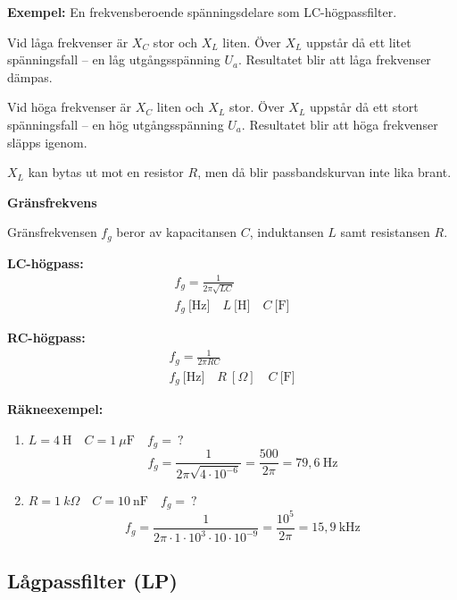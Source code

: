 \textbf{Exempel:} En frekvensberoende spänningsdelare som LC-högpassfilter.

Vid låga frekvenser är \(X_C\) stor och \(X_L\) liten.
Över \(X_L\) uppstår då ett litet spänningsfall -- en låg utgångsspänning \(U_a\).
Resultatet blir att låga frekvenser dämpas.

Vid höga frekvenser är \(X_C\) liten och \(X_L\) stor.
Över \(X_L\) uppstår då ett stort spänningsfall -- en hög utgångsspänning
\(U_a\).
Resultatet blir att höga frekvenser släpps igenom.

\(X_L\) kan bytas ut mot en resistor \(R\), men då blir passbandskurvan inte lika brant.

\textbf{Gränsfrekvens}

Gränsfrekvensen \(f_g\) beror av kapacitansen \(C\), induktansen \(L\) samt
resistansen \(R\).

\textbf{LC-högpass:}
\begin{gather*}
  f_g = \frac{1}{2\pi \sqrt{LC}} \\
  f_g\ \text{[Hz]} \quad L\ \text{[H]} \quad C\ \text{[F]}
\end{gather*}

\textbf{RC-högpass:}
\begin{gather*}
  f_g = \frac{1}{2\pi RC}\\
  f_g\ \text{[Hz]} \quad R\ [\Omega] \quad C\ \text{[F]}
\end{gather*}

\textbf{Räkneexempel:}
\begin{enumerate}
\item \(L = 4\ \text{H} \quad C = 1\ \mu\text{F} \quad f_g =\ ?\)
  \[
  f_g = \frac{1}{2\pi \sqrt{4 \cdot 10^{-6}}} = \frac{500}{2\pi }
  = 79,6\ \text{Hz}
  \]
\item \(R = 1\ k\Omega \quad C = 10\ \text{nF} \quad f_g =\ ?\)
  \[
    f_g = \frac{1}{2\pi  \cdot 1 \cdot 10^3 \cdot 10 \cdot 10^{-9}}
    = \frac{10^5}{2\pi } = 15,9\ \text{kHz}
  \]
\end{enumerate}

\subsection{Lågpassfilter (LP)}



